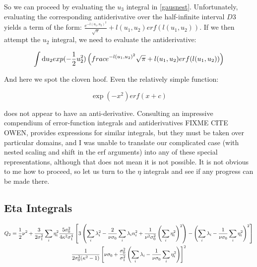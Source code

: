 \documentclass[10pt,letterpaper]{article}
\def\half{{1 \over 2}}
\def\d{{\rm d}}  %
\begin{document}
So we can proceed by evaluating the $u_3$ integral in \ref{gausnest}. Unfortunately, evaluating the corresponding antiderivative over the half-infinite interval $D3$ yields a term of the form: $\frac{e^{-l(u_1,u_2)^2}}{\sqrt{\pi}} + l(u_1,u_2) erf(l(u_1,u_2))$. If we then attempt the $u_2$ integral, we need to evaluate the antiderivative: 

\begin{equation*}
\int \d u_2 exp(-\frac{1}{2} u_2^2) \left(frac{e^{-l(u_1,u_2)^2}}{\sqrt{\pi}} + l(u_1,u_2) erf(l(u_1,u_2))\right)
\end{equation*}

And here we spot the cloven hoof. Even the relatively simple function:

\begin{equation} \label{eq:nonointegral}
\exp(-x^2) erf(x+c)
\end{equation}

does not appear to have an anti-derivative. Consulting an impressive compendium of error-function integrals and antiderivatives FIXME CITE OWEN, provides expressions for similar integrals, but they must be taken over particular domains, and I was unable to translate our complicated case (with nested scaling and shift in the erf arguments) into any of these special representations, although that does not mean it is not possible.
It is not obvious to me how to proceed, so let us turn to the $\eta$ integrals and see if any progress can be made there.

\subsection{Eta Integrals}


\begin{gather*}
Q_2 = \half \nu^2 + {3 \over 2 \sigma_1^2} \sum_{i} \nonumber
     \eta_{i}^2
     {5 \sigma_0^2 \over 4 \kappa^2 \sigma_1^4} \left[3
     \left( \sum_i \lambda_i^2 - {2 \over \nu \sigma_0} \sum_i
     \lambda_i  n_i^2 + {1 \over \nu^2 \sigma_0^2} \left(
     \sum_i \eta_i^2 \right)^2\right) - \left(\sum_i
     \lambda_i - {1 \over \nu \sigma_0} \sum_i \eta_i^2
     \right)^2\right]\\ 
     {1 \over 2 \sigma_0^2 (\kappa^2 - 1)}
     \left[\nu \sigma_0 + {\sigma_0^2 \over \sigma_1^2}
     \left(\sum_i \lambda_i - {1 \over \nu \sigma_0} \sum_i
     \eta_i^2 \right)\right]^2 \\ \nonumber
\end{gather*}
\end{document}

